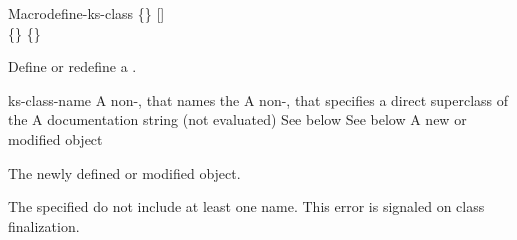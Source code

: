 \documentclass[10pt,twoside,english,pdftex]{article}
\begin{document}

\begin{functiondoc}{Macro}{define-ks-class}%
   { 
   \code{(}\{\}\superstar\code{)}
   [] \\
   \code{(}\{\}\superstar\code{)}
   \{\}\superstar{}
   \returns{} }
%
%
%

\fnsyntax

\fnpurpose Define or redefine a .

\fnpackage {}

\fnmodule {}

\fnargs
\begin{args}{ks-class-name}
 A non-\nil,  that names the
 A non-\nil,  that specifies a
direct superclass of the  
\arg[documentation] A documentation string (not evaluated)
 See below
 See below
 A new or modified  object
\end{args}

\fnreturns The newly defined or modified  object.

\fnerrors The specified  do not include at least
one  name.  This error is signaled on class finalization.


\end{functiondoc}
\end{document}
